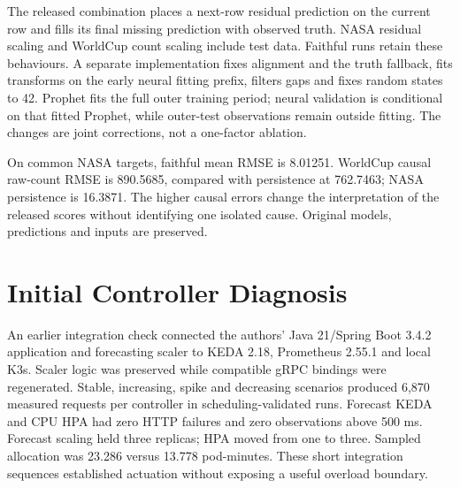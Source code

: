 \documentclass[10pt,twocolumn,a4paper]{article}
\begin{document}
The released combination places a next-row residual prediction on the current row and fills its final missing prediction with observed truth. NASA residual scaling and WorldCup count scaling include test data. Faithful runs retain these behaviours. A separate implementation fixes alignment and the truth fallback, fits transforms on the early neural fitting prefix, filters gaps and fixes random states to 42. Prophet fits the full outer training period; neural validation is conditional on that fitted Prophet, while outer-test observations remain outside fitting. The changes are joint corrections, not a one-factor ablation.


\begin{table}[t]\centering\small\setlength{\tabcolsep}{3pt}
\caption{Forecast RMSE. Faithful means use full released tests; causal NASA excludes 29 gap targets. WorldCup is displayed on the common author scale after causal fitting.}\label{tab:baseline}
\ifdim\wd\databox>\columnwidth\relax\resizebox{\columnwidth}{!}{\usebox{\databox}}\else\usebox{\databox}\fi
\end{table}


On common NASA targets, faithful mean RMSE is 8.01251. WorldCup causal raw-count RMSE is 890.5685, compared with persistence at 762.7463; NASA persistence is 16.3871. The higher causal errors change the interpretation of the released scores without identifying one isolated cause. Original models, predictions and inputs are preserved.

\section{Initial Controller Diagnosis}
An earlier integration check connected the authors' Java 21/Spring Boot 3.4.2 application and forecasting scaler to KEDA 2.18, Prometheus 2.55.1 and local K3s. Scaler logic was preserved while compatible gRPC bindings were regenerated. Stable, increasing, spike and decreasing scenarios produced 6,870 measured requests per controller in scheduling-validated runs. Forecast KEDA and CPU HPA had zero HTTP failures and zero observations above 500 ms. Forecast scaling held three replicas; HPA moved from one to three. Sampled allocation was 23.286 versus 13.778 pod-minutes. These short integration sequences established actuation without exposing a useful overload boundary.
\end{document}
